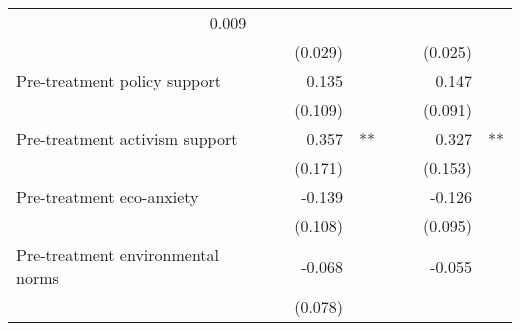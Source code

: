 \documentclass{article}
\begin{document}
\begin{table}[!h]
\begin{tabular}{lllllllll}
  \multicolumn{1}{r}{0.009} &
  \multicolumn{1}{l}{} \\
\multicolumn{1}{l}{} &
  \multicolumn{1}{r}{} &
  \multicolumn{1}{l}{} &
  \multicolumn{1}{r}{(0.029)} &
  \multicolumn{1}{l}{} &
  \multicolumn{1}{r}{} &
  \multicolumn{1}{l}{} &
  \multicolumn{1}{r}{(0.025)} &
  \multicolumn{1}{l}{} \\
\multicolumn{1}{l}{Pre-treatment policy support} &
  \multicolumn{1}{r}{} &
  \multicolumn{1}{l}{} &
  \multicolumn{1}{r}{0.135} &
  \multicolumn{1}{l}{} &
  \multicolumn{1}{r}{} &
  \multicolumn{1}{l}{} &
  \multicolumn{1}{r}{0.147} &
  \multicolumn{1}{l}{} \\
\multicolumn{1}{l}{} &
  \multicolumn{1}{r}{} &
  \multicolumn{1}{l}{} &
  \multicolumn{1}{r}{(0.109)} &
  \multicolumn{1}{l}{} &
  \multicolumn{1}{r}{} &
  \multicolumn{1}{l}{} &
  \multicolumn{1}{r}{(0.091)} &
  \multicolumn{1}{l}{} \\
\multicolumn{1}{l}{Pre-treatment activism support} &
  \multicolumn{1}{r}{} &
  \multicolumn{1}{l}{} &
  \multicolumn{1}{r}{0.357} &
  \multicolumn{1}{l}{**} &
  \multicolumn{1}{r}{} &
  \multicolumn{1}{l}{} &
  \multicolumn{1}{r}{0.327} &
  \multicolumn{1}{l}{**} \\
\multicolumn{1}{l}{} &
  \multicolumn{1}{r}{} &
  \multicolumn{1}{l}{} &
  \multicolumn{1}{r}{(0.171)} &
  \multicolumn{1}{l}{} &
  \multicolumn{1}{r}{} &
  \multicolumn{1}{l}{} &
  \multicolumn{1}{r}{(0.153)} &
  \multicolumn{1}{l}{} \\
\multicolumn{1}{l}{Pre-treatment eco-anxiety} &
  \multicolumn{1}{r}{} &
  \multicolumn{1}{l}{} &
  \multicolumn{1}{r}{-0.139} &
  \multicolumn{1}{l}{} &
  \multicolumn{1}{r}{} &
  \multicolumn{1}{l}{} &
  \multicolumn{1}{r}{-0.126} &
  \multicolumn{1}{l}{} \\
\multicolumn{1}{l}{} &
  \multicolumn{1}{r}{} &
  \multicolumn{1}{l}{} &
  \multicolumn{1}{r}{(0.108)} &
  \multicolumn{1}{l}{} &
  \multicolumn{1}{r}{} &
  \multicolumn{1}{l}{} &
  \multicolumn{1}{r}{(0.095)} &
  \multicolumn{1}{l}{} \\
\multicolumn{1}{l}{Pre-treatment environmental norms} &
  \multicolumn{1}{r}{} &
  \multicolumn{1}{l}{} &
  \multicolumn{1}{r}{-0.068} &
  \multicolumn{1}{l}{} &
  \multicolumn{1}{r}{} &
  \multicolumn{1}{l}{} &
  \multicolumn{1}{r}{-0.055} &
  \multicolumn{1}{l}{} \\
\multicolumn{1}{l}{} &
  \multicolumn{1}{r}{} &
  \multicolumn{1}{l}{} &
  \multicolumn{1}{r}{(0.078)} &
  \multicolumn{1}{l}{} &
  \multicolumn{1}{r}{} &
  \multicolumn{1}{l}{} &

\end{tabular}
\end{table}
\end{document}
